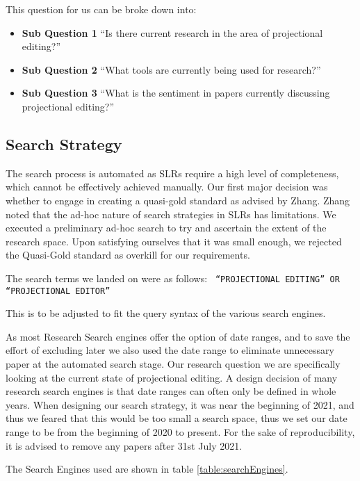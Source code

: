 This question for us can be broke down into:
\begin{itemize}
    \item \textbf{Sub Question 1} ``Is there current research in the area of projectional editing?''
    \item \textbf{Sub Question 2} ``What tools are currently being used for research?''
    \item \textbf{Sub Question 3} ``What is the sentiment in papers currently discussing projectional editing?''
\end{itemize}


\subsection{Search Strategy}

The search process is automated as SLRs require a high level of completeness, which cannot be effectively achieved manually.
Our first major decision was whether to engage in creating a quasi-gold standard as advised by Zhang\cite{Zhang_2011}.
Zhang noted that the ad-hoc nature of search strategies in SLRs has limitations.
We executed a preliminary ad-hoc search to try and ascertain the extent of the research space.
Upon satisfying ourselves that it was small enough, we rejected the Quasi-Gold standard as overkill for our requirements.

The search terms we landed on were as follows:
{\obeylines\obeyspaces
\texttt{
    ``PROJECTIONAL EDITING'' 
       OR 
    ``PROJECTIONAL EDITOR'' 
}}

This is to be adjusted to fit the query syntax of the various search engines.

As most Research Search engines offer the option of date ranges, and to save the effort of excluding later we also used the date range to eliminate unnecessary paper at the automated search stage.
Our research question we are specifically looking at the current state of projectional editing.
A design decision of many research search engines is that date ranges can often only be defined in whole years.
When designing our search strategy, it was near the beginning of 2021, and thus we feared that this would be too small a search space, thus we set our date range to be from the beginning of 2020 to present.
For the sake of reproducibility, it is advised to remove any papers after 31st July 2021.

The Search Engines used are shown in table \ref{table:searchEngines}.

